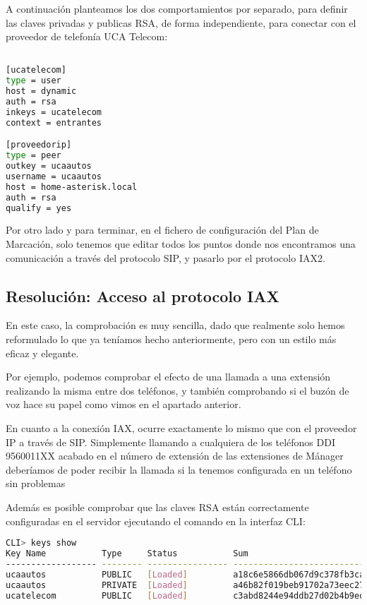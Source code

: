 A continuación planteamos los dos comportamientos por separado, para definir las claves privadas y publicas RSA, de forma independiente, para conectar con el proveedor de telefonía UCA Telecom:

\begin{lstlisting}[language=bash,title={/etc/asterisk/iax.conf}]

[ucatelecom]
type = user
host = dynamic
auth = rsa
inkeys = ucatelecom
context = entrantes

[proveedorip]
type = peer
outkey = ucaautos
username = ucaautos
host = home-asterisk.local
auth = rsa
qualify = yes

\end{lstlisting}

Por otro lado y para terminar, en el fichero de configuración del Plan de Marcación, solo tenemos que editar todos los puntos donde nos encontramos una comunicación a través del protocolo SIP, y pasarlo por el protocolo IAX2. 

\subsection{Resolución: Acceso al protocolo IAX}

En este caso, la comprobación es muy sencilla, dado que realmente solo hemos reformulado lo que ya teníamos hecho anteriormente, pero con un estilo más eficaz y elegante. 

Por ejemplo, podemos comprobar el efecto de una llamada a una extensión realizando la misma entre dos teléfonos, y también comprobando si el buzón de voz hace su papel como vimos en el apartado anterior.

En cuanto a la conexión IAX, ocurre exactamente lo mismo que con el proveedor IP a través de SIP. Simplemente llamando a cualquiera de los teléfonos DDI 9560011XX acabado en el número de extensión de las extensiones de Mánager deberíamos de poder recibir la llamada si la tenemos configurada en un teléfono sin problemas

Además es posible comprobar que las claves RSA están correctamente configuradas en el servidor ejecutando el comando en la interfaz CLI:

\begin{lstlisting}[language=sh]
CLI> keys show
Key Name           Type     Status           Sum
------------------ -------- ---------------- --------------------------------
ucaautos           PUBLIC   [Loaded]         a18c6e5866db067d9c378fb3cafd967c
ucaautos           PRIVATE  [Loaded]         a46b82f019beb91702a73eec276bf6b6
ucatelecom         PUBLIC   [Loaded]         c3abd8244e94ddb27d02b4b9ed9f9236
\end{lstlisting}

